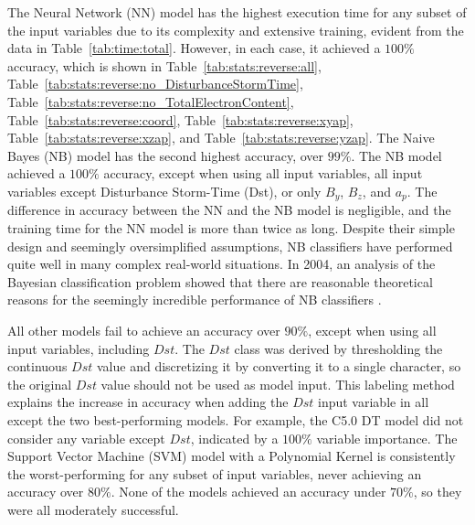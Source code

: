 \documentclass[sn-mathphys-num]{sn-jnl}%
\begin{document}
The Neural Network (NN) model has the highest execution time for any subset of the input variables due to its complexity and extensive training, evident from the data in Table~\ref{tab:time:total}. However, in each case, it achieved a $100\%$ accuracy, which is shown in Table~\ref{tab:stats:reverse:all}, Table~\ref{tab:stats:reverse:no_DisturbanceStormTime}, Table~\ref{tab:stats:reverse:no_TotalElectronContent}, Table~\ref{tab:stats:reverse:coord}, Table~\ref{tab:stats:reverse:xyap}, Table~\ref{tab:stats:reverse:xzap}, and Table~\ref{tab:stats:reverse:yzap}. The Naive Bayes (NB) model has the second highest accuracy, over $99\%$. The NB model achieved a $100\%$ accuracy, except when using all input variables, all input variables except Disturbance Storm-Time (Dst), or only $B_{y}$, $B_{z}$, and $a_{p}$. The difference in accuracy between the NN and the NB model is negligible, and the training time for the NN model is more than twice as long. Despite their simple design and seemingly oversimplified assumptions, NB classifiers have performed quite well in many complex real-world situations. In 2004, an analysis of the Bayesian classification problem showed that there are reasonable theoretical reasons for the seemingly incredible performance of NB classifiers \cite{Zhang2004}.

All other models fail to achieve an accuracy over $90\%$, except when using all input variables, including $Dst$. The $Dst$ class was derived by thresholding the continuous $Dst$ value and discretizing it by converting it to a single character, so the original $Dst$ value should not be used as model input. This labeling method explains the increase in accuracy when adding the $Dst$ input variable in all except the two best-performing models. For example, the C5.0 DT model did not consider any variable except $Dst$, indicated by a $100\%$ variable importance. The Support Vector Machine (SVM) model with a Polynomial Kernel is consistently the worst-performing for any subset of input variables, never achieving an accuracy over $80\%$. None of the models achieved an accuracy under $70\%$, so they were all moderately successful.
\end{document}
